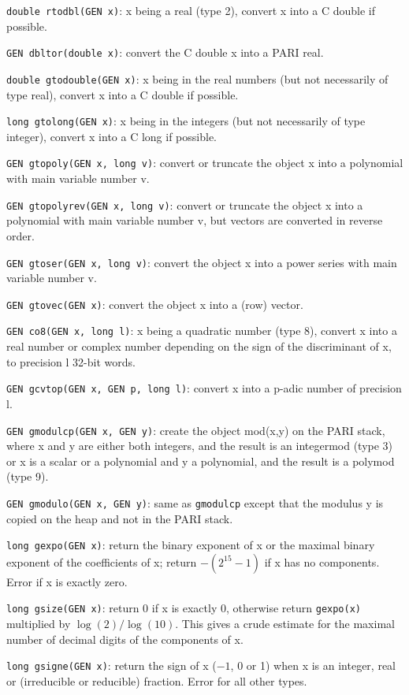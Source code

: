 {\tt double rtodbl(GEN x)}: x being a real (type 2), convert x into a
C double if possible.

{\tt GEN dbltor(double x)}: convert the C double x into a PARI real.

{\tt double gtodouble(GEN x)}: x being in the real numbers (but not 
necessarily of type real), convert x into a C double if possible. 

{\tt long gtolong(GEN x)}: x being in the integers (but not necessarily of type
integer), convert x into a C long if possible.

{\tt GEN gtopoly(GEN x, long v)}: convert or truncate the object x into a 
polynomial with main variable number v.

{\tt GEN gtopolyrev(GEN x, long v)}: convert or truncate the object x into a 
polynomial with main variable number v, but vectors are converted in reverse
order.

{\tt GEN gtoser(GEN x, long v)}: convert the object x into a power series
with main variable number v.

{\tt GEN gtovec(GEN x)}: convert the object x into a (row) vector.

{\tt GEN co8(GEN x, long l)}: x being a quadratic number (type 8), convert x
into a real number or complex number depending on the sign of the discriminant
of x, to precision l 32-bit words.

{\tt GEN gcvtop(GEN x, GEN p, long l)}: convert x into a p-adic number of
precision l.

{\tt GEN gmodulcp(GEN x, GEN y)}: create the object mod(x,y) on the PARI stack,
where x and y are either both integers, and the result is an integermod 
(type 3) or x is a scalar or a polynomial and y a polynomial, and the result is
a polymod (type 9).

{\tt GEN gmodulo(GEN x, GEN y)}: same as {\tt gmodulcp} except that the modulus
y is copied on the heap and not in the PARI stack.

{\tt long gexpo(GEN x)}: return the binary exponent of x or the maximal
binary exponent of the coefficients of x; return $-(2^{15}-1)$ if x has no
components. Error if x is exactly zero.

{\tt long gsize(GEN x)}: return 0 if x is exactly 0, otherwise return
{\tt gexpo(x)} multiplied by $\log(2)/\log(10)$. This gives a crude estimate
for the maximal number of decimal digits of the components of x.

{\tt long gsigne(GEN x)}: return the sign of x ($-1$, 0 or 1) when x is an 
integer, real or (irreducible or reducible) fraction. Error for all other
types.

